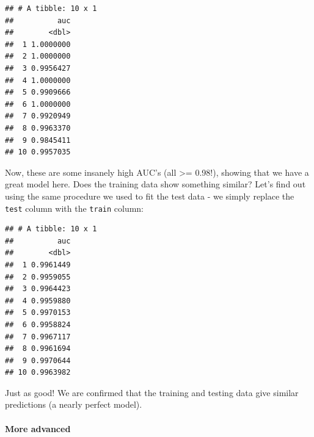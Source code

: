 \documentclass[]{article}
\newenvironment{Shaded}{\begin{snugshade}}{\end{snugshade}}
\newcommand{\KeywordTok}[1]{\textcolor[rgb]{0.13,0.29,0.53}{\textbf{#1}}}
\newcommand{\DataTypeTok}[1]{\textcolor[rgb]{0.13,0.29,0.53}{#1}}
\newcommand{\StringTok}[1]{\textcolor[rgb]{0.31,0.60,0.02}{#1}}
\newcommand{\OperatorTok}[1]{\textcolor[rgb]{0.81,0.36,0.00}{\textbf{#1}}}
\newcommand{\NormalTok}[1]{#1}
\let\oldparagraph\paragraph
\renewcommand{\paragraph}[1]{\oldparagraph{#1}\mbox{}}
\begin{document}
\begin{verbatim}
## # A tibble: 10 x 1
##          auc
##        <dbl>
##  1 1.0000000
##  2 1.0000000
##  3 0.9956427
##  4 1.0000000
##  5 0.9909666
##  6 1.0000000
##  7 0.9920949
##  8 0.9963370
##  9 0.9845411
## 10 0.9957035
\end{verbatim}

Now, these are some insanely high AUC's (all \textgreater{}= 0.98!),
showing that we have a great model here. Does the training data show
something similar? Let's find out using the same procedure we used to
fit the test data - we simply replace the \texttt{test} column with the
\texttt{train} column:

\begin{Shaded}
\end{Shaded}

\begin{verbatim}
## # A tibble: 10 x 1
##          auc
##        <dbl>
##  1 0.9961449
##  2 0.9959055
##  3 0.9964423
##  4 0.9959880
##  5 0.9970153
##  6 0.9958824
##  7 0.9967117
##  8 0.9961694
##  9 0.9970644
## 10 0.9963982
\end{verbatim}

Just as good! We are confirmed that the training and testing data give
similar predictions (a nearly perfect model).

\paragraph{More advanced}\label{more-advanced}
\end{document}
